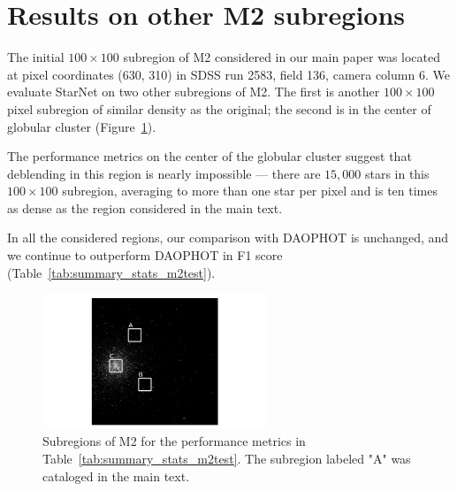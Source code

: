 \section{Results on other M2 subregions}
\label{sec:test_m2}

The initial $100\times100$ subregion of M2 considered in our main paper was located at pixel coordinates (630, 310) in SDSS run 2583, field 136, camera column 6. 
We evaluate StarNet on two other subregions of M2.
The first is another $100\times100$ pixel subregion of similar density as the original;
the second is in the center of globular cluster
(Figure~\ref{fig:m2_test_regions}).

The performance metrics on the center of the globular cluster 
suggest that deblending in this region is nearly impossible --- there are $15,000$ stars in this $100\times100$ subregion, 
averaging to more than one star per pixel
and is 
ten times as dense as the region considered in the main text.

In all the considered regions, our comparison with DAOPHOT is unchanged, and we continue to outperform DAOPHOT in F1 score (Table~\ref{tab:summary_stats_m2test}). 

\begin{figure}[tb]
    \centering
    \includegraphics[width=0.6\textwidth]{figures/m2_results/test_images.png}
    \caption{Subregions of M2 for the performance metrics in Table~\ref{tab:summary_stats_m2test}. The subregion labeled "A" was cataloged in the main text. 
}
    \label{fig:m2_test_regions}
\end{figure}



